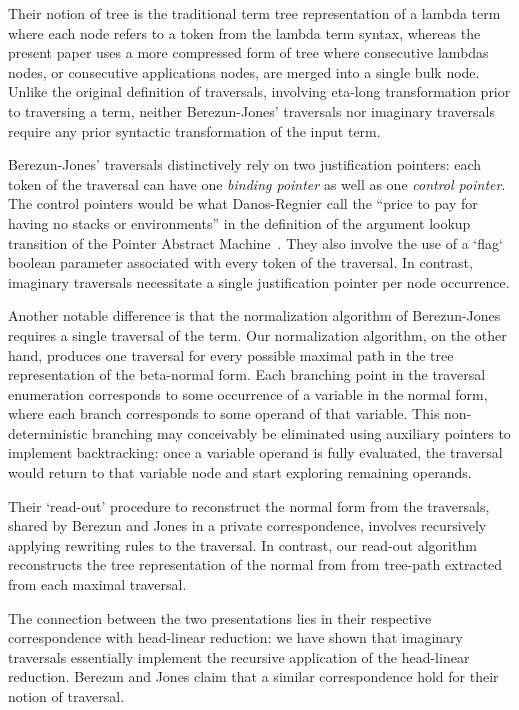 \documentclass{elsarticle}
\theoremstyle{plain}
\theoremstyle{definition}
\theoremstyle{remark}
\begin{document}
Their notion of tree is the traditional term tree representation of a lambda term where each node refers to a token from the lambda term syntax, whereas the present paper uses a more compressed form of tree where consecutive lambdas nodes, or consecutive applications nodes, are merged into a single bulk node. Unlike the original definition of traversals, involving eta-long transformation prior to traversing a term, neither Berezun-Jones' traversals nor imaginary traversals require any prior syntactic transformation of the input term.

Berezun-Jones' traversals distinctively rely on two justification pointers: each token of the traversal can have one \emph{binding pointer} as well as one \emph{control pointer}. The control pointers would be what Danos-Regnier call the ``price to pay for having no stacks or environments'' in the definition of the argument lookup transition of the Pointer Abstract Machine~\cite{danos-head}. They also involve the use of a `flag` boolean parameter associated with every token of the traversal.
In contrast, imaginary traversals necessitate a single justification pointer per node occurrence.

Another notable difference is that the normalization algorithm of Berezun-Jones requires a single traversal of the term. Our normalization algorithm, on the other hand, produces one traversal for every possible maximal path in the tree representation of the beta-normal form. Each branching point in the traversal enumeration corresponds to some occurrence of a variable in the normal form, where each branch corresponds to some operand of that variable. This non-deterministic branching may conceivably be eliminated using auxiliary pointers to implement backtracking: once a variable operand is fully evaluated, the traversal would return to that variable node and start exploring remaining operands.

Their `read-out' procedure to reconstruct the normal form from the traversals, shared by Berezun and Jones in a private correspondence, involves recursively applying rewriting rules to the traversal. In contrast, our read-out algorithm reconstructs the tree representation of the normal from from tree-path extracted from each maximal traversal.

The connection between the two presentations lies in their respective correspondence with head-linear reduction: we have shown that imaginary traversals essentially implement the recursive application of the head-linear reduction. Berezun and Jones claim that a similar correspondence hold for their notion of traversal.
\end{document}
